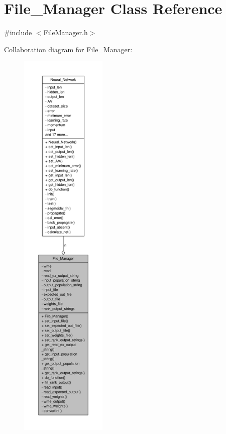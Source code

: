 \hypertarget{a00001}{\section{File\-\_\-\-Manager Class Reference}
\label{d8/d84/a00001}
}


{\ttfamily \#include $<$File\-Manager.\-h$>$}



Collaboration diagram for File\-\_\-\-Manager\-:
\nopagebreak
\begin{figure}[H]
\begin{center}
\leavevmode
\includegraphics[height=550pt]{dd/d32/a00041}
\end{center}
\end{figure}
